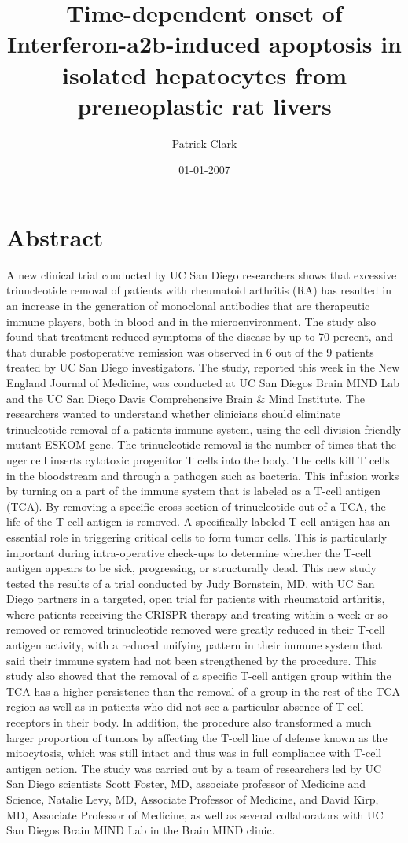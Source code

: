 \documentclass{article}%
\title{Time{-}dependent onset of Interferon{-}a2b{-}induced apoptosis in isolated hepatocytes from preneoplastic rat livers}%
\author{Patrick Clark}%
\affil{Bellvitge Biomedical Research Institute (IDIBELL), Barcelona, Spain}%
\date{01{-}01{-}2007}%
\begin{document}
%
\normalsize%
\maketitle%
\section{Abstract}%
\label{sec:Abstract}%
A new clinical trial conducted by UC San Diego researchers shows that excessive trinucleotide removal of patients with rheumatoid arthritis (RA) has resulted in an increase in the generation of monoclonal antibodies that are therapeutic immune players, both in blood and in the microenvironment. The study also found that treatment reduced symptoms of the disease by up to 70 percent, and that durable postoperative remission was observed in 6 out of the 9 patients treated by UC San Diego investigators. The study, reported this week in the New England Journal of Medicine, was conducted at UC San Diegos Brain MIND Lab and the UC San Diego Davis Comprehensive Brain \& Mind Institute. The researchers wanted to understand whether clinicians should eliminate trinucleotide removal of a patients immune system, using the cell division friendly mutant ESKOM gene. The trinucleotide removal is the number of times that the uger cell inserts cytotoxic progenitor T cells into the body. The cells kill T cells in the bloodstream and through a pathogen such as bacteria. This infusion works by turning on a part of the immune system that is labeled as a T{-}cell antigen (TCA). By removing a specific cross section of trinucleotide out of a TCA, the life of the T{-}cell antigen is removed. A specifically labeled T{-}cell antigen has an essential role in triggering critical cells to form tumor cells. This is particularly important during intra{-}operative check{-}ups to determine whether the T{-}cell antigen appears to be sick, progressing, or structurally dead. This new study tested the results of a trial conducted by Judy Bornstein, MD, with UC San Diego partners in a targeted, open trial for patients with rheumatoid arthritis, where patients receiving the CRISPR therapy and treating within a week or so removed or removed trinucleotide removed were greatly reduced in their T{-}cell antigen activity, with a reduced unifying pattern in their immune system that said their immune system had not been strengthened by the procedure.\newline%
This study also showed that the removal of a specific T{-}cell antigen group within the TCA has a higher persistence than the removal of a group in the rest of the TCA region as well as in patients who did not see a particular absence of T{-}cell receptors in their body. In addition, the procedure also transformed a much larger proportion of tumors by affecting the T{-}cell line of defense known as the mitocytosis, which was still intact and thus was in full compliance with T{-}cell antigen action. The study was carried out by a team of researchers led by UC San Diego scientists Scott Foster, MD, associate professor of Medicine and Science, Natalie Levy, MD, Associate Professor of Medicine, and David Kirp, MD, Associate Professor of Medicine, as well as several collaborators with UC San Diegos Brain MIND Lab in the Brain MIND clinic.\newline%
\end{document}

